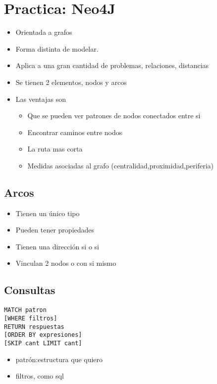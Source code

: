 \section{Practica: Neo4J}

\begin{itemize}
\item Orientada a grafos
\item Forma distinta de modelar.
\item Aplica a una gran cantidad de problemas, relaciones, distancias
\item Se tienen 2 elementos, nodos y arcos
\item Las ventajas son
    \begin{itemize}
    \item Que se pueden ver patrones de nodos conectados entre si
    \item Encontrar caminos entre nodos
    \item La ruta mas corta
    \item Medidas asociadas al grafo (centralidad,proximidad,periferia)
    \end{itemize}
\end{itemize}



\subsection*{Arcos}
\begin{itemize}
\item Tienen un único tipo
\item Pueden tener propiedades
\item Tienen una dirección si o si
\item Vinculan 2 nodos o con si mismo
\end{itemize}


\subsection*{Consultas}

\begin{verbatim}
MATCH patron
[WHERE filtros]
RETURN respuestas
[ORDER BY expresiones]
[SKIP cant LIMIT cant]  
\end{verbatim}


\begin{itemize}
\item patrón:estructura que quiero
\item filtros, como sql
\end{itemize}



